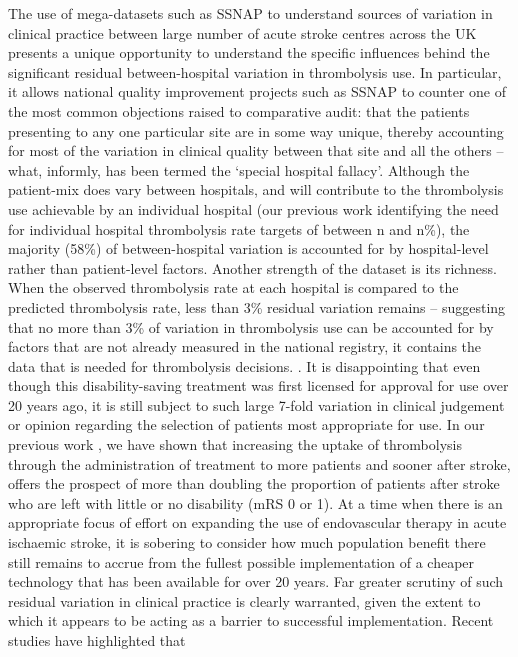 The use of mega-datasets such as SSNAP to understand sources of variation in clinical practice between large number of acute stroke centres across the UK presents a unique opportunity to understand the specific influences behind the significant residual between-hospital variation in thrombolysis use.  In particular, it allows national quality improvement projects such as SSNAP to counter one of the most common objections raised to comparative audit: that the patients presenting to any one particular site are in some way unique, thereby accounting for most of the variation in clinical quality between that site and all the others – what, informly, has been termed the `special hospital fallacy'. Although the patient-mix does vary between hospitals, and will contribute to the thrombolysis use achievable by an individual hospital (our previous work identifying the need for individual hospital thrombolysis rate targets of between n and n\%), the majority (58\%) of between-hospital variation is accounted for by hospital-level rather than patient-level factors. Another strength of the dataset is its richness. When the observed thrombolysis rate at each hospital is compared to the predicted thrombolysis rate, less than 3\% residual variation remains – suggesting that no more than 3\% of variation in thrombolysis use can be accounted for by factors that are not already measured in the national registry, it contains the data that is needed for thrombolysis decisions. . It is disappointing that even though this disability-saving treatment was first licensed for approval for use over 20 years ago, it is still subject to such large 7-fold variation in clinical judgement or opinion regarding the selection of patients most appropriate for use. In our previous work \cite{allen_using_2022}, we have shown that increasing the uptake of thrombolysis through the administration of treatment to more patients and sooner after stroke, offers the prospect of more than doubling the proportion of patients after stroke who are left with little or no disability (mRS 0 or 1). At a time when there is an appropriate focus of effort on expanding the use of endovascular therapy in acute ischaemic stroke, it is sobering to consider how much population benefit there still remains to accrue from the fullest possible implementation of a cheaper technology that has been available for over 20 years. Far greater scrutiny of such residual variation in clinical practice is clearly warranted, given the extent to which it appears to be acting as a barrier to successful implementation. Recent studies have highlighted that 
